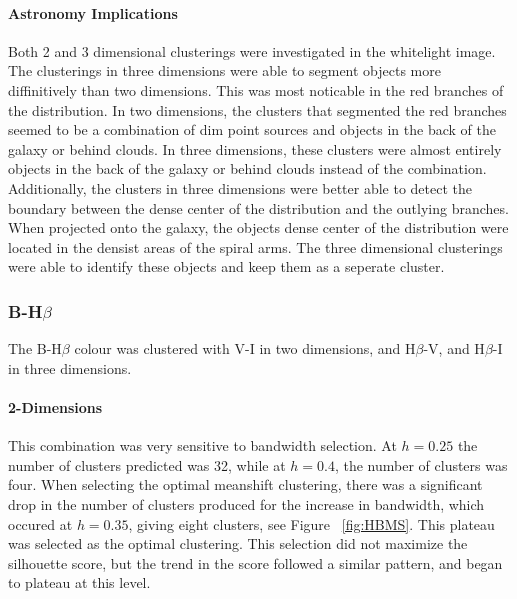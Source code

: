 \paragraph{Astronomy Implications}
Both 2 and 3 dimensional clusterings were investigated in the whitelight image. 
The clusterings in three dimensions were able to segment objects more diffinitively than two dimensions.
This was most noticable in the red branches of the distribution.
In two dimensions, the clusters that segmented the red branches seemed to be a combination of dim point sources and objects in the back of the galaxy or behind clouds.
In three dimensions, these clusters were almost entirely objects in the back of the galaxy or behind clouds instead of the combination.
Additionally, the clusters in three dimensions were better able to detect the boundary between the dense center of the distribution and the outlying branches.
When projected onto the galaxy, the objects dense center of the distribution were located in the densist areas of the spiral arms.
The three dimensional clusterings were able to identify these objects and keep them as a seperate cluster.

\subsubsection{B-H$\beta$}
The B-H$\beta$ colour was clustered with V-I in two dimensions, and H$\beta$-V, and H$\beta$-I in three dimensions.

\paragraph{2-Dimensions}
This combination was very sensitive to bandwidth selection. At $h=0.25$ the number of clusters predicted was 32, while at $h=0.4$, the number of clusters was four.
When selecting the optimal meanshift clustering, there was a significant drop in the number of clusters produced for the increase in bandwidth, which occured at $h=0.35$, giving eight clusters, see Figure ~\ref{fig:HBMS}.
This plateau was selected as the optimal clustering.
This selection did not maximize the silhouette score, but the trend in the score followed a similar pattern, and began to plateau at this level.


